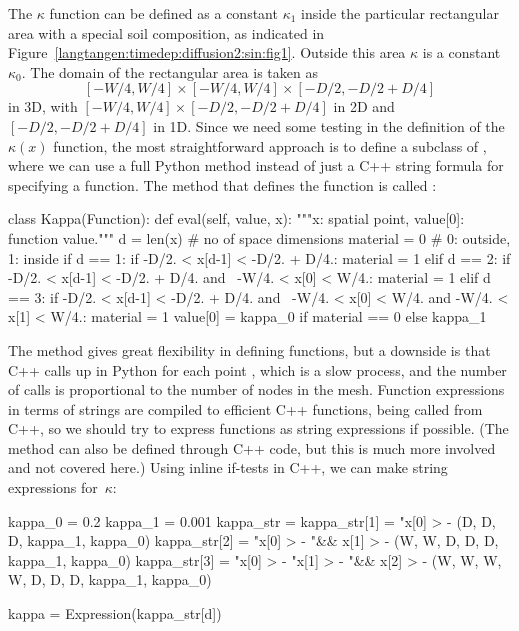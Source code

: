 The $\kappa$ function can be defined as a constant $\kappa_1$ inside
the particular rectangular area with a special soil composition, as
indicated in Figure~\ref{langtangen:timedep:diffusion2:sin:fig1}. Outside
this area $\kappa$ is a constant $\kappa_0$.
The domain of the rectangular area is taken as
\[ [-W/4, W/4]\times [-W/4, W/4]\times [-D/2, -D/2 + D/4]\]
in 3D, with $[-W/4, W/4]\times [-D/2, -D/2 + D/4]$ in 2D and
$[-D/2, -D/2 + D/4]$ in 1D.
Since we need some testing in the definition of the $\kappa(x)$
function, the most straightforward approach is to define a subclass
of , where we can use a full Python method instead of
just a C++ string formula for specifying a function.
The method that defines the function is called :
\begin{python}
class Kappa(Function):
    def eval(self, value, x):
        """x: spatial point, value[0]: function value."""
        d = len(x)  # no of space dimensions
        material = 0  # 0: outside, 1: inside
        if d == 1:
            if -D/2. < x[d-1] < -D/2. + D/4.:
                material = 1
        elif d == 2:
            if -D/2. < x[d-1] < -D/2. + D/4. and \
               -W/4. < x[0] < W/4.:
                material = 1
        elif d == 3:
            if -D/2. < x[d-1] < -D/2. + D/4. and \
               -W/4. < x[0] < W/4. and -W/4. < x[1] < W/4.:
                material = 1
        value[0] = kappa_0 if material == 0 else kappa_1
\end{python}
The  method gives great flexibility in defining functions, but a
downside is that C++ calls up \emp{eval} in Python for each point ,
which is a slow process, and the number of calls is proportional to the
number of nodes in the mesh.  Function expressions in terms of strings
are compiled to efficient C++ functions, being called from C++, so we
should try to express functions as string expressions if possible. (The
\emp{eval} method can also be defined through C++ code, but this is
much more involved and not covered here.)  Using inline if-tests in C++,
we can make string expressions for~$\kappa$:
\begin{python}
kappa_0 = 0.2
kappa_1 = 0.001
kappa_str = {}
kappa_str[1] = "x[0] > -%
               (D, D, D, kappa_1, kappa_0)
kappa_str[2] = "x[0] > -%
            "&& x[1] > -%
               (W, W, D, D, D, kappa_1, kappa_0)
kappa_str[3] = "x[0] > -%
               "x[1] > -%
            "&& x[2] > -%
               (W, W, W, W, D, D, D, kappa_1, kappa_0)

kappa = Expression(kappa_str[d])
\end{python}

